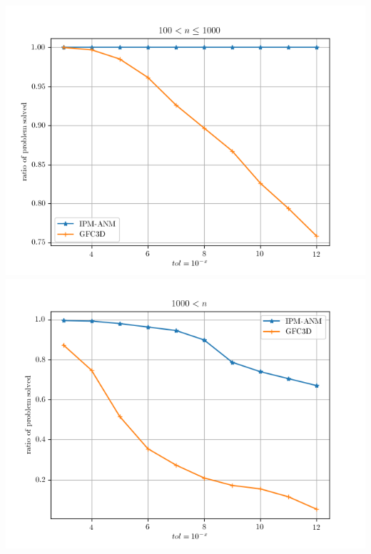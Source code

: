 \begin{frame}
\begin{center}
    \includegraphics[height=\figheightanm\textheight]{./figure/IPM/anm_solver_performance_101_1000.png}
    \includegraphics[height=\figheightanm\textheight]{./figure/IPM/anm_solver_performance_1000_.png}
 \end{center}
\end{frame}




